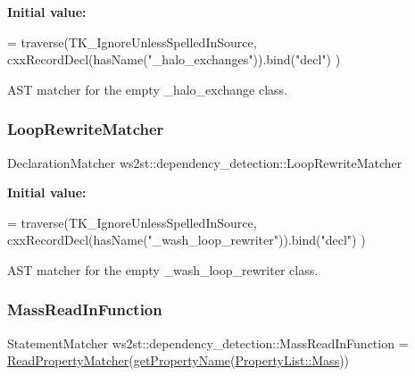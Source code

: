 {\bfseries Initial value\+:}
\begin{DoxyCode}
= traverse(TK\_IgnoreUnlessSpelledInSource, 
        cxxRecordDecl(hasName(\textcolor{stringliteral}{"\_halo\_exchanges"})).bind(\textcolor{stringliteral}{"decl"})
    )
\end{DoxyCode}


A\+ST matcher for the empty \+\_\+halo\+\_\+exchange class. 

\mbox{\label{namespacews2st_1_1dependency__detection_a6d11e3426c8b2c1d088996d1f2c847f0}} 
\subsubsection{\texorpdfstring{Loop\+Rewrite\+Matcher}{LoopRewriteMatcher}}
{\footnotesize\ttfamily Declaration\+Matcher ws2st\+::dependency\+\_\+detection\+::\+Loop\+Rewrite\+Matcher}

{\bfseries Initial value\+:}
\begin{DoxyCode}
= traverse(TK\_IgnoreUnlessSpelledInSource, 
        cxxRecordDecl(hasName(\textcolor{stringliteral}{"\_wash\_loop\_rewriter"})).bind(\textcolor{stringliteral}{"decl"})
    )
\end{DoxyCode}


A\+ST matcher for the empty \+\_\+wash\+\_\+loop\+\_\+rewriter class. 

\mbox{\label{namespacews2st_1_1dependency__detection_a7adcb594b2dcd56ca1d726b9e128de6f}} 
\subsubsection{\texorpdfstring{Mass\+Read\+In\+Function}{MassReadInFunction}}
{\footnotesize\ttfamily Statement\+Matcher ws2st\+::dependency\+\_\+detection\+::\+Mass\+Read\+In\+Function = \mbox{\hyperlink{namespacews2st_1_1dependency__detection_aa8821ec3e79b7058ff4ac29b7b5a8374}{Read\+Property\+Matcher}}(\mbox{\hyperlink{namespacews2st_1_1dependency__detection_aa7715a6e777bd59ab78718644a58b1fa}{get\+Property\+Name}}(\mbox{\hyperlink{namespacews2st_1_1dependency__detection_abcddd986f080a9e5c494edfad3c3faf7aff2864d6f652ee0ac254814f1ae4f4a8}{Property\+List\+::\+Mass}}))}

